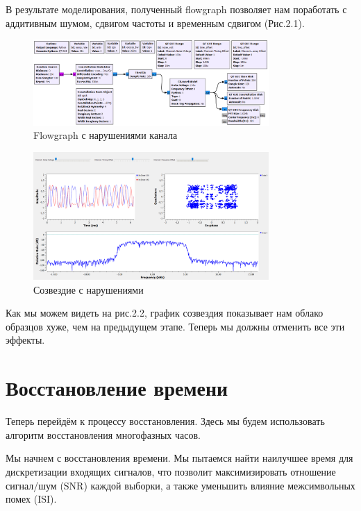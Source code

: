\documentclass[a4paper,12pt]{report}
\begin{document}
    В результате моделирования, полученный flowgraph позволяет нам поработать с аддитивным шумом, сдвигом частоты и временным сдвигом (Рис.2.1).
\begin{figure}[H]
        \centering
        \includegraphics[width=0.8\textwidth]{fig2-1.PNG}
        \caption{Flowgraph с нарушениями канала}
        \label{fig:fig2-1}
\end{figure}
\begin{figure}[H]
        \centering
        \includegraphics[width=0.8\textwidth]{fig2-2.PNG}
        \caption{Созвездие с нарушениями}
        \label{fig:fig2-2}
\end{figure}
    
    Как мы можем видеть на рис.2.2, график созвездия показывает нам облако образцов хуже, чем на предыдущем этапе. Теперь мы должны отменить все эти эффекты.

\chapter{Восстановление времени}
    Теперь перейдём к процессу восстановления. Здесь мы будем использовать алгоритм восстановления многофазных часов.
    
    Мы начнем с восстановления времени. Мы пытаемся найти наилучшее время для дискретизации входящих сигналов, что позволит максимизировать отношение сигнал/шум (SNR) каждой выборки, а также уменьшить влияние межсимвольных помех (ISI).
\end{document}
